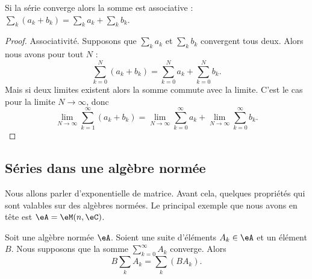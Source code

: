\begin{proposition}     \label{PROPooUEBWooUQBQvP}
    Si la série converge alors la somme est associative :
    \( \sum_k (a_k+b_k) = \sum_k a_k + \sum_k b_k \).
\end{proposition}

\begin{proof}
    Associativité. Supposons que \( \sum_ka_k\) et \( \sum_kb_k\) convergent tous deux. Alors nous avons pour tout \( N\) :
    \begin{equation}
        \sum_{k=0}^N(a_k+b_k)=\sum_{k=0}^Na_k+\sum_{k=0}^Nb_k.
    \end{equation}
    Mais si deux limites existent alors la somme commute avec la limite. C'est le cas pour la limite \( N\to \infty\), donc
    \begin{equation}
        \lim_{N\to \infty} \sum_{k=1}^{\infty}(a_k+b_k)=\lim_{N\to \infty} \sum_{k=0}^{\infty}a_k+\lim_{N\to \infty} \sum_{k=0}^{\infty}b_k.
    \end{equation}
\end{proof}



\subsection{Séries dans une algèbre normée}

Nous allons parler d'exponentielle de matrice. Avant cela, quelques propriétés qui sont valables sur des algèbres normées. Le principal exemple que nous avons en tête est \( \eA=\eM(n,\eC)\).

\begin{proposition}      \label{PROPooMZZQooEhQsgQ}
    Soit une algèbre normée \( \eA\). Soient une suite d'éléments \( A_k\in \eA\) et un élément \( B\). Nous supposons que la somme \( \sum_{k=0}^{\infty}A_k\) converge. Alors
    \begin{equation}
        B\sum_kA_k=\sum_k(BA_k).
    \end{equation}
\end{proposition}

